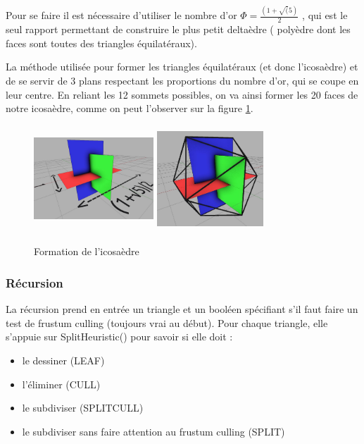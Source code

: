 	Pour se faire il est nécessaire d'utiliser le nombre d'or $\Phi = \frac{(1+\sqrt(5)}{2}$ , qui est le seul rapport permettant de construire le plus petit deltaèdre ( polyèdre dont les faces sont toutes des triangles équilatéraux).
	
	La méthode utilisée pour former les triangles équilatéraux (et donc l'icosaèdre) et de se servir de 3 plans respectant les proportions du nombre d'or, qui se coupe en leur centre. En reliant les 12 sommets possibles, on va ainsi former les 20 faces de notre icosaèdre, comme on peut l'observer sur la figure \ref{fig:plans-icosaèdre}.
	
	\begin{figure}[H]
        \centerline{
            \includegraphics[height=4cm,width=4.5cm]{img/3plans.png}
            \includegraphics[height=4cm,width=4cm]{img/3plans2.png}}
        \caption{Formation de l'icosaèdre \protect\footnotemark}
        \label{fig:plans-icosaèdre}
	\end{figure}
	
	
	\subsubsection{Récursion}
	
	La récursion prend en entrée un triangle et un booléen spécifiant s'il faut faire un test de frustum culling (toujours vrai au début). Pour chaque triangle, elle s'appuie sur SplitHeuristic() pour savoir si elle doit :
	\begin{itemize} 
	\item le dessiner (LEAF)
	\item l'éliminer (CULL)
	\item le subdiviser (SPLITCULL)
	\item le subdiviser sans faire attention au frustum culling (SPLIT)
	\end{itemize}
